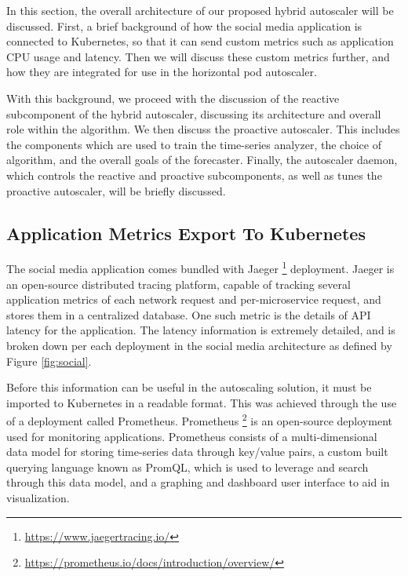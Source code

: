 In this section, the overall architecture of our proposed hybrid autoscaler will be discussed. First, a brief background of how the social media application is connected to Kubernetes, so that it can send custom metrics such as application CPU usage and latency. Then we will discuss these custom metrics further, and how they are integrated for use in the horizontal pod autoscaler.\par

With this background, we proceed with the discussion of the reactive subcomponent of the hybrid autoscaler, discussing its architecture and overall role within the algorithm. We then discuss the proactive autoscaler. This includes the components which are used to train the time-series analyzer, the choice of algorithm, and the overall goals of the forecaster. Finally, the autoscaler daemon, which controls the reactive and proactive subcomponents, as well as tunes the proactive autoscaler, will be briefly discussed.\par

\subsection{Application Metrics Export To Kubernetes}
\label{subsec:metrics-export}

The social media application comes bundled with Jaeger \footnote{\url{https://www.jaegertracing.io/}} deployment. Jaeger is an open-source distributed tracing platform, capable of tracking several application metrics of each network request and per-microservice request, and stores them in a centralized database. One such metric is the details of API latency for the application. The latency information is extremely detailed, and is broken down per each deployment in the social media architecture as defined by Figure \ref{fig:social}.\par

Before this information can be useful in the autoscaling solution, it must be imported to Kubernetes in a readable format. This was achieved through the use of a deployment called Prometheus. Prometheus \footnote{\url{https://prometheus.io/docs/introduction/overview/}} is an open-source deployment used for monitoring applications. Prometheus consists of a multi-dimensional data model for storing time-series data through key/value pairs, a custom built querying language known as PromQL, which is used to leverage and search through this data model, and a graphing and dashboard user interface to aid in visualization.\par

